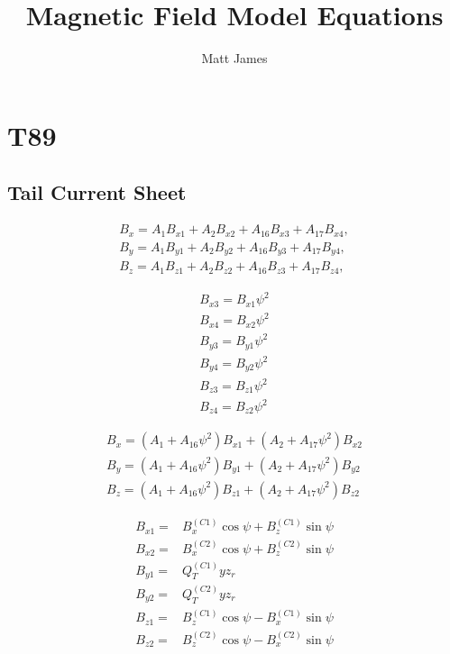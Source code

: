 \documentclass[]{article}
\title{Magnetic Field Model Equations}
\author{Matt James}
\begin{document}
\maketitle

	
\section{T89}

	\subsection{Tail Current Sheet}
		\begin{align}
			B_x = A_1B_{x1} + A_2B_{x2} + A_{16}B_{x3} + A_{17}B_{x4},\\
			B_y = A_1B_{y1} + A_2B_{y2} + A_{16}B_{y3} + A_{17}B_{y4},\\
			B_z = A_1B_{z1} + A_2B_{z2} + A_{16}B_{z3} + A_{17}B_{z4},
		\end{align}
	
		\begin{align}
			B_{x3} = B_{x1}\psi^2 \\
			B_{x4} = B_{x2}\psi^2 \\
			B_{y3} = B_{y1}\psi^2 \\
			B_{y4} = B_{y2}\psi^2 \\
			B_{z3} = B_{z1}\psi^2 \\
			B_{z4} = B_{z2}\psi^2 
		\end{align}
	
		\begin{align}
			B_x = (A_1 + A_{16} \psi^2)B_{x1} + (A_2 + A_{17} \psi^2)B_{x2} \\
			B_y = (A_1 + A_{16} \psi^2)B_{y1} + (A_2 + A_{17} \psi^2)B_{y2} \\
			B_z = (A_1 + A_{16} \psi^2)B_{z1} + (A_2 + A_{17} \psi^2)B_{z2} 
		\end{align}
	
		\begin{align}
			B_{x1} =& B_{x}^{(C1)}\cos{\psi} + B_{z}^{(C1)}\sin{\psi} \\
			B_{x2} =& B_{x}^{(C2)}\cos{\psi} + B_{z}^{(C2)}\sin{\psi} \\
			B_{y1} =& Q_T^{(C1)} y z_r \\
			B_{y2} =& Q_T^{(C2)} y z_r \\
			B_{z1} =& B_{z}^{(C1)}\cos{\psi} - B_{x}^{(C1)}\sin{\psi} \\
			B_{z2} =& B_{z}^{(C2)}\cos{\psi} - B_{x}^{(C2)}\sin{\psi} 
		\end{align}
	
\end{document}
